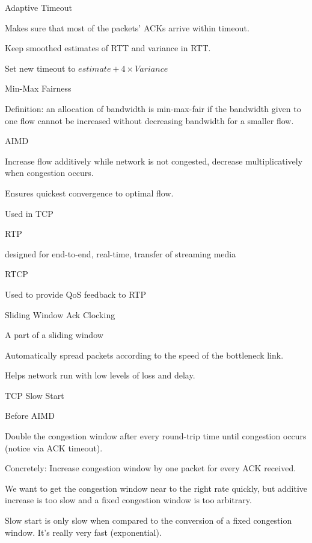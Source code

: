 \documentclass[main.tex]{subfiles}
\begin{document}
\begin{card}{Adaptive Timeout}
\item Makes sure that most of the packets' ACKs arrive within timeout.
\item Keep smoothed estimates of RTT and variance in RTT.
\item Set new timeout to $estimate + 4\times Variance$
\end{card}

\begin{card}{Min-Max Fairness}
\item Definition: an allocation of bandwidth is min-max-fair if the bandwidth given to one flow cannot be increased without decreasing bandwidth for a smaller flow.
\end{card}

\begin{card}{AIMD}
\item Increase flow additively while network is not congested, decrease multiplicatively when congestion occurs.
\item Ensures quickest convergence to optimal flow.
\item Used in TCP
\end{card}

\begin{card}{RTP}
\item designed for end-to-end, real-time, transfer of streaming media
\end{card}

\begin{card}{RTCP}
\item Used to provide QoS feedback to RTP
\end{card}

\begin{card}{Sliding Window Ack Clocking}
\item A part of a sliding window
\item Automatically spread packets according to the speed of the bottleneck link.
\item Helps network run with low levels of loss and delay.
\end{card}

\begin{card}{TCP Slow Start}
\item Before AIMD
\item Double the congestion window after every round-trip time until congestion occurs (notice via ACK timeout).
\item Concretely: Increase congestion window by one packet for every ACK received.
\item We want to get the congestion window near to the right rate quickly, but additive increase is too slow and a fixed congestion window is too arbitrary.
\item Slow start is only slow when compared to the conversion of a fixed congestion window. It's really very fast (exponential).
\end{card}
\end{document}
